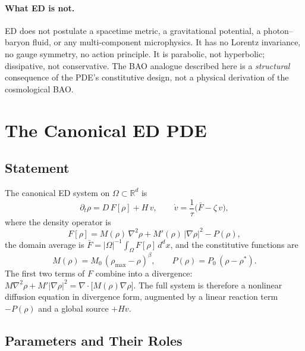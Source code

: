 \documentclass[11pt]{article}
\begin{document}
\paragraph{What ED is not.} ED does not postulate a spacetime metric, a gravitational potential, a photon--baryon fluid, or any multi-component microphysics. It has no Lorentz invariance, no gauge symmetry, no action principle. It is parabolic, not hyperbolic; dissipative, not conservative. The BAO analogue described here is a \emph{structural} consequence of the PDE's constitutive design, not a physical derivation of the cosmological BAO.

\section{The Canonical ED PDE}
\label{sec:pde}

\subsection{Statement}

The canonical ED system on \(\Omega \subset \mathbb{R}^d\) is
\begin{equation}\label{eq:system}
  \partial_t \rho = D\,F[\rho] + H\,v, \qquad
  \dot{v} = \frac{1}{\tau}\bigl(\bar{F} - \zeta\,v\bigr),
\end{equation}
where the density operator is
\begin{equation}\label{eq:operator}
  F[\rho] = M(\rho)\,\nabla^2\rho + M'(\rho)\,|\nabla\rho|^2 - P(\rho),
\end{equation}
the domain average is \(\bar{F} = |\Omega|^{-1}\int_\Omega F[\rho]\,d^d\!x\), and the constitutive functions are
\begin{equation}\label{eq:constitutive}
  M(\rho) = M_0\,(\rho_{\max} - \rho)^\beta, \qquad
  P(\rho) = P_0\,(\rho - \rho^*).
\end{equation}
The first two terms of \(F\) combine into a divergence: \(M\nabla^2\rho + M'|\nabla\rho|^2 = \nabla\!\cdot\!\bigl[M(\rho)\nabla\rho\bigr]\). The full system is therefore a nonlinear diffusion equation in divergence form, augmented by a linear reaction term \(-P(\rho)\) and a global source \(+Hv\).

\subsection{Parameters and Their Roles}
\end{document}
